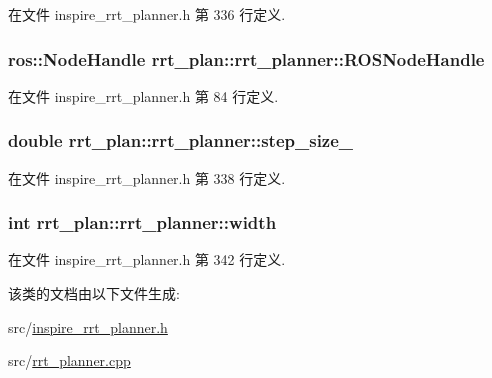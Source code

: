 在文件 inspire\-\_\-rrt\-\_\-planner.\-h 第 336 行定义.

\hypertarget{classrrt__plan_1_1rrt__planner_a9547688a6e31166034dc562a0b4608b6}{
\subsubsection[{R\-O\-S\-Node\-Handle}]{\setlength{\rightskip}{0pt plus 5cm}ros\-::\-Node\-Handle rrt\-\_\-plan\-::rrt\-\_\-planner\-::\-R\-O\-S\-Node\-Handle}}\label{classrrt__plan_1_1rrt__planner_a9547688a6e31166034dc562a0b4608b6}


在文件 inspire\-\_\-rrt\-\_\-planner.\-h 第 84 行定义.

\hypertarget{classrrt__plan_1_1rrt__planner_a25be58fd52b495ade819f8d5785beeae}{
\subsubsection[{step\-\_\-size\-\_\-}]{\setlength{\rightskip}{0pt plus 5cm}double rrt\-\_\-plan\-::rrt\-\_\-planner\-::step\-\_\-size\-\_\-}}\label{classrrt__plan_1_1rrt__planner_a25be58fd52b495ade819f8d5785beeae}


在文件 inspire\-\_\-rrt\-\_\-planner.\-h 第 338 行定义.

\hypertarget{classrrt__plan_1_1rrt__planner_ac74fe436b5e1fa30bda1fbe821369aa2}{
\subsubsection[{width}]{\setlength{\rightskip}{0pt plus 5cm}int rrt\-\_\-plan\-::rrt\-\_\-planner\-::width}}\label{classrrt__plan_1_1rrt__planner_ac74fe436b5e1fa30bda1fbe821369aa2}


在文件 inspire\-\_\-rrt\-\_\-planner.\-h 第 342 行定义.



该类的文档由以下文件生成\-:\begin{DoxyCompactItemize}
\item 
src/\hyperlink{inspire__rrt__planner_8h}{inspire\-\_\-rrt\-\_\-planner.\-h}\item 
src/\hyperlink{rrt__planner_8cpp}{rrt\-\_\-planner.\-cpp}\end{DoxyCompactItemize}
